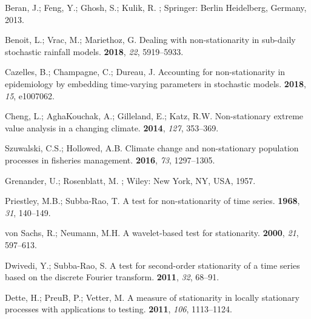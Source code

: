 \documentclass[aps,pra,groupedaddress,notitlepage]{revtex4-1}
\begin{document}
\begin{thebibliography}{999}

Beran, J.; Feng, Y.; Ghosh, S.; Kulik, R.
;
\newblock Springer:  Berlin Heidelberg, Germany, 2013. %

Benoit, L.; Vrac, M.; Mariethoz, G.
\newblock Dealing with non-stationarity in sub-daily stochastic rainfall
  models.
  \textbf{2018}, \emph{22}, 5919--5933.

Cazelles, B.; Champagne, C.; Dureau, J.
\newblock Accounting for non-stationarity in epidemiology by embedding
  time-varying parameters in stochastic models.
  \textbf{2018}, \emph{15},  e1007062.

Cheng, L.; AghaKouchak, A.; Gilleland, E.; Katz, R.W.
\newblock Non-stationary extreme value analysis in a changing climate.
  \textbf{2014}, \emph{127},  353--369.

Szuwalski, C.S.; Hollowed, A.B.
\newblock Climate change and non-stationary population processes in fisheries
  management.
  \textbf{2016}, \emph{73},  1297--1305.

Grenander, U.; Rosenblatt, M.
;
\newblock  Wiley: New York, NY, USA,  1957.

Priestley, M.B.; Subba-Rao, T.
\newblock A test for non-stationarity of time series.
  \textbf{1968}, \emph{31},   140--149.

von Sachs, R.; Neumann, M.H.
\newblock A wavelet-based test for stationarity.
  \textbf{2000}, \emph{21},   597--613.

Dwivedi, Y.; Subba-Rao, S.
\newblock A test for second-order stationarity of a time series based on the
  discrete {F}ourier transform.
  \textbf{2011}, \emph{32},   68--91.

Dette, H.; PreuB, P.; Vetter, M.
\newblock A measure of stationarity in locally stationary processes with
  applications to testing.
  \textbf{2011},
  \emph{106},   1113--1124.


\end{thebibliography}
\end{document}
